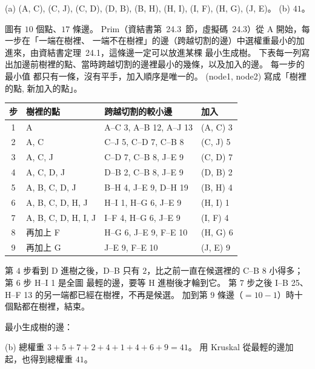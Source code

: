 \begin{pastsoln}
(a) (A, C), (C, J), (C, D), (D, B), (B, H), (H, I), (I, F), (H, G), (J, E)。\quad
(b) $41$。

圖有 $10$ 個點、$17$ 條邊。 Prim（資結書第~24.3~節，虛擬碼~24.3）從 A 開始，每一步在「一端在樹裡、
一端不在樹裡」的邊（跨越切割的邊）中選權重最小的加進來，由資結書定理~24.1，這條邊一定可以放進某棵
最小生成樹。 下表每一列寫出加邊前樹裡的點、當時跨越切割的邊裡最小的幾條，以及加入的邊。 每一步的最小值
都只有一條，沒有平手，加入順序是唯一的。 (node1, node2) 寫成「樹裡的點, 新加入的點」。
\begin{center}
\small
\begin{tabular}{clll}
\toprule
步 & 樹裡的點 & 跨越切割的較小邊 & 加入 \\
\midrule
1 & A & A--C 3, A--B 12, A--J 13 & (A, C) 3 \\
2 & A, C & C--J 5, C--D 7, C--B 8 & (C, J) 5 \\
3 & A, C, J & C--D 7, C--B 8, J--E 9 & (C, D) 7 \\
4 & A, C, D, J & D--B 2, C--B 8, J--E 9 & (D, B) 2 \\
5 & A, B, C, D, J & B--H 4, J--E 9, D--H 19 & (B, H) 4 \\
6 & A, B, C, D, H, J & H--I 1, H--G 6, J--E 9 & (H, I) 1 \\
7 & A, B, C, D, H, I, J & I--F 4, H--G 6, J--E 9 & (I, F) 4 \\
8 & 再加上 F & H--G 6, J--E 9, F--E 10 & (H, G) 6 \\
9 & 再加上 G & J--E 9, F--E 10 & (J, E) 9 \\
\bottomrule
\end{tabular}
\end{center}
第 $4$ 步看到 D 進樹之後，D--B 只有 $2$，比之前一直在候選裡的 C--B 8 小得多；第 $6$ 步 H--I 1 是全圖
最輕的邊，要等 H 進樹後才輪到它。 第 $7$ 步之後 I--B 25、H--F 13 的另一端都已經在樹裡，不再是候選。
加到第 $9$ 條邊（$= 10 - 1$）時十個點都在樹裡，結束。

最小生成樹的邊：
\begin{center}
\end{center}

(b) 總權重 $3 + 5 + 7 + 2 + 4 + 1 + 4 + 6 + 9 = 41$。 用 Kruskal 從最輕的邊加起，也得到總權重 $41$。
\end{pastsoln}
